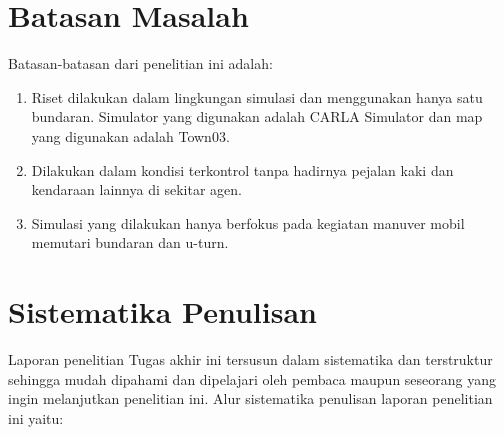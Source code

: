 \section{Batasan Masalah}
\label{sec:batasanmasalah}

Batasan-batasan dari penelitian ini adalah:

\begin{enumerate}[nolistsep]
	
	\item Riset dilakukan dalam lingkungan simulasi dan menggunakan hanya satu bundaran. Simulator yang digunakan adalah CARLA Simulator dan map yang digunakan adalah Town03.
	
	\item Dilakukan dalam kondisi terkontrol tanpa hadirnya pejalan kaki dan kendaraan lainnya di sekitar agen.
	
	\item Simulasi yang dilakukan hanya berfokus pada kegiatan manuver mobil memutari bundaran dan u-turn.
	
\end{enumerate}


\section{Sistematika Penulisan}
\label{sec:sistematikapenulisan}

Laporan penelitian Tugas akhir ini tersusun dalam sistematika dan terstruktur sehingga mudah dipahami dan dipelajari oleh pembaca maupun seseorang yang ingin melanjutkan penelitian ini. Alur sistematika penulisan laporan penelitian ini yaitu:

